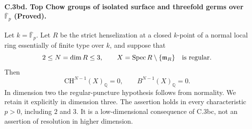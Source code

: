 \paragraph{C.3bd. Top Chow groups of isolated surface and threefold
germs over \(\overline{\mathbb F}_p\) (Proved).}
Let \(k=\overline{\mathbb F}_p\). Let \(R\) be the strict
henselization at a closed \(k\)-point of a normal local ring
essentially of finite type over \(k\), and suppose that
\[
                  2\leq N=\dim R\leq3,\qquad
                  X=\operatorname{Spec}R\setminus\{\mathfrak m_R\}
                  \quad\hbox{is regular}.
\]
Then
\[
                         \mathrm{CH}^{N-1}(X)_{\mathbb Q}=0,
                 \qquad B^{N-1}(X)_{\mathbb Q}=0.
\]
In dimension two the regular-puncture hypothesis follows from
normality. We retain it explicitly in dimension three. The assertion
holds in every characteristic \(p>0\), including \(2\) and \(3\).
It is a low-dimensional consequence of C.3bc, not an assertion of
resolution in higher dimension.

